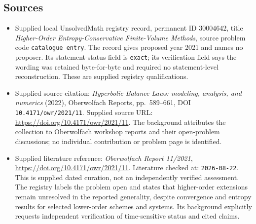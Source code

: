 \documentclass[11pt]{article}
\begin{document}
\subsection{Sources}
\begin{itemize}
\item Supplied local UnsolvedMath registry record, permanent ID \(30004642\), title \emph{Higher-Order Entropy-Conservative Finite-Volume Methods}, source problem code \texttt{catalogue entry}. The record gives proposed year 2021 and names no proposer. Its statement-status field is \texttt{exact}; its verification field says the wording was retained byte-for-byte and required no statement-level reconstruction. These are supplied registry qualifications.
\item Supplied source citation: \emph{Hyperbolic Balance Laws: modeling, analysis, and numerics} (2022), Oberwolfach Reports, pp.\ 589--661, DOI \texttt{10.4171/owr/2021/11}. Supplied source URL: \url{https://doi.org/10.4171/owr/2021/11}. The background attributes the collection to Oberwolfach workshop reports and their open-problem discussions; no individual contribution or problem page is identified.
\item Supplied literature reference: \emph{Oberwolfach Report 11/2021}, \url{https://doi.org/10.4171/owr/2021/11}. Literature checked at: \texttt{2026-08-22}. This is supplied dated curation, not an independently verified assessment. The registry labels the problem open and states that higher-order extensions remain unresolved in the reported generality, despite convergence and entropy results for selected lower-order schemes and systems. Its background explicitly requests independent verification of time-sensitive status and cited claims.
\end{itemize}
\end{document}
